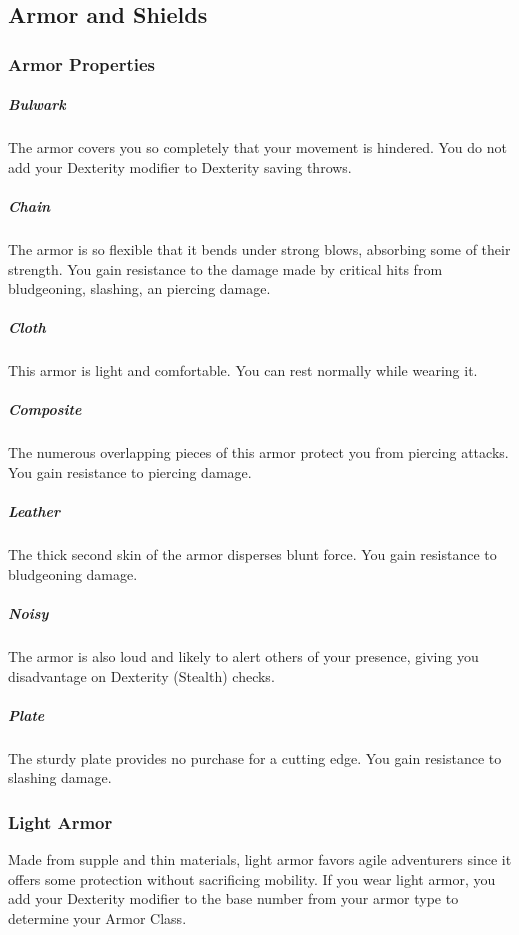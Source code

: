 \subsection*{Armor and Shields} \label{ssec::armorandshields}
\subsubsection{Armor Properties} \label{ssec::armorproperties}
    \subparagraph{Bulwark}
        The armor covers you so completely that your movement is hindered.
        You do not add your Dexterity modifier to Dexterity saving throws.
    \subparagraph{Chain}
        The armor is so flexible that it bends under strong blows, absorbing some of their strength.
        You gain resistance to the damage made by critical hits from bludgeoning, slashing, an piercing damage.
    \subparagraph{Cloth}
        This armor is light and comfortable.
        You can rest normally while wearing it.
    \subparagraph{Composite}
        The numerous overlapping pieces of this armor protect you from piercing attacks.
        You gain resistance to piercing damage.
    \subparagraph{Leather}
        The thick second skin of the armor disperses blunt force.
        You gain resistance to bludgeoning damage.
    \subparagraph{Noisy}
        The armor is also loud and likely to alert others of your presence, giving you disadvantage on Dexterity (Stealth) checks.
    \subparagraph{Plate}
        The sturdy plate provides no purchase for a cutting edge.
        You gain resistance to slashing damage.
\subsubsection{Light Armor} \label{ssec::lightarmor}
    Made from supple and thin materials, light armor favors agile adventurers since it offers some protection without sacrificing mobility.
    If you wear light armor, you add your Dexterity modifier to the base number from your armor type to determine your Armor Class.

